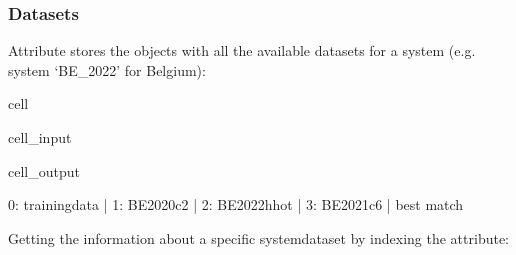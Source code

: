 \documentclass[letterpaper,10pt,english]{sphinxmanual}
\begin{document}
\subsubsection{Datasets}
\label{\detokenize{userguide:id2}}
\sphinxAtStartPar
Attribute  stores the  objects with all the available datasets for a system (e.g. system ‘BE\_2022’ for Belgium):

\begin{sphinxuseclass}{cell}
\begin{sphinxuseclass}{cell_input}
\begin{sphinxVerbatim}[commandchars=\\\{\}]
\PYG{p}{[}\PYG{p}{]}\PYG{p}{[}\PYG{p}{]}
\end{sphinxVerbatim}

\end{sphinxuseclass}
\begin{sphinxuseclass}{cell_output}
\begin{sphinxVerbatim}[commandchars=\\\{\}]
0: training\PYGZus{}data     |             
1: BE\PYGZus{}2020\PYGZus{}c2        |             
2: BE\PYGZus{}2022\PYGZus{}hhot      |             
3: BE\PYGZus{}2021\PYGZus{}c6        | best match  
\end{sphinxVerbatim}

\end{sphinxuseclass}
\end{sphinxuseclass}
\sphinxAtStartPar
Getting the information about a specific system\sphinxhyphen{}dataset by indexing the  attribute:
\end{document}
